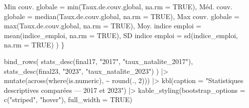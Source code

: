 \documentclass[
  letterpaper,
  DIV=11,
  numbers=noendperiod]{scrartcl}
\newenvironment{Shaded}{\begin{snugshade}}{\end{snugshade}}
\newcommand{\AttributeTok}[1]{\textcolor[rgb]{0.40,0.45,0.13}{#1}}
\newcommand{\ConstantTok}[1]{\textcolor[rgb]{0.56,0.35,0.01}{#1}}
\newcommand{\DecValTok}[1]{\textcolor[rgb]{0.68,0.00,0.00}{#1}}
\newcommand{\FunctionTok}[1]{\textcolor[rgb]{0.28,0.35,0.67}{#1}}
\newcommand{\NormalTok}[1]{\textcolor[rgb]{0.00,0.23,0.31}{#1}}
\newcommand{\OtherTok}[1]{\textcolor[rgb]{0.00,0.23,0.31}{#1}}
\newcommand{\SpecialCharTok}[1]{\textcolor[rgb]{0.37,0.37,0.37}{#1}}
\newcommand{\StringTok}[1]{\textcolor[rgb]{0.13,0.47,0.30}{#1}}
\begin{document}
\begin{Shaded}
\begin{Highlighting}[]
      \StringTok{\textasciigrave{}}\AttributeTok{Min couv. globale}\StringTok{\textasciigrave{}}  \OtherTok{=} \FunctionTok{min}\NormalTok{(Taux.de.couv.global, }\AttributeTok{na.rm =} \ConstantTok{TRUE}\NormalTok{),}
      \StringTok{\textasciigrave{}}\AttributeTok{Méd. couv. globale}\StringTok{\textasciigrave{}} \OtherTok{=} \FunctionTok{median}\NormalTok{(Taux.de.couv.global, }\AttributeTok{na.rm =} \ConstantTok{TRUE}\NormalTok{),}
      \StringTok{\textasciigrave{}}\AttributeTok{Max couv. globale}\StringTok{\textasciigrave{}}  \OtherTok{=} \FunctionTok{max}\NormalTok{(Taux.de.couv.global, }\AttributeTok{na.rm =} \ConstantTok{TRUE}\NormalTok{),}
      \StringTok{\textasciigrave{}}\AttributeTok{Moy. indice emploi}\StringTok{\textasciigrave{}} \OtherTok{=} \FunctionTok{mean}\NormalTok{(indice\_emploi, }\AttributeTok{na.rm =} \ConstantTok{TRUE}\NormalTok{),}
      \StringTok{\textasciigrave{}}\AttributeTok{SD indice emploi}\StringTok{\textasciigrave{}}   \OtherTok{=} \FunctionTok{sd}\NormalTok{(indice\_emploi, }\AttributeTok{na.rm =} \ConstantTok{TRUE}\NormalTok{)}
\NormalTok{    )}
\NormalTok{\}}

\FunctionTok{bind\_rows}\NormalTok{(}
  \FunctionTok{stats\_desc}\NormalTok{(final17, }\StringTok{"2017"}\NormalTok{, }\StringTok{"taux\_natalite\_2017"}\NormalTok{),}
  \FunctionTok{stats\_desc}\NormalTok{(final23, }\StringTok{"2023"}\NormalTok{, }\StringTok{"taux\_natalite\_2023"}\NormalTok{)}
\NormalTok{) }\SpecialCharTok{|\textgreater{}}
  \FunctionTok{mutate}\NormalTok{(}\FunctionTok{across}\NormalTok{(}\FunctionTok{where}\NormalTok{(is.numeric), }\SpecialCharTok{\textasciitilde{}} \FunctionTok{round}\NormalTok{(., }\DecValTok{2}\NormalTok{))) }\SpecialCharTok{|\textgreater{}}
  \FunctionTok{kbl}\NormalTok{(}\AttributeTok{caption =} \StringTok{"Statistiques descriptives comparées — 2017 et 2023"}\NormalTok{) }\SpecialCharTok{|\textgreater{}}
  \FunctionTok{kable\_styling}\NormalTok{(}\AttributeTok{bootstrap\_options =} \FunctionTok{c}\NormalTok{(}\StringTok{"striped"}\NormalTok{, }\StringTok{"hover"}\NormalTok{), }\AttributeTok{full\_width =} \ConstantTok{TRUE}\NormalTok{)}
\end{Highlighting}
\end{Shaded}
\end{document}
